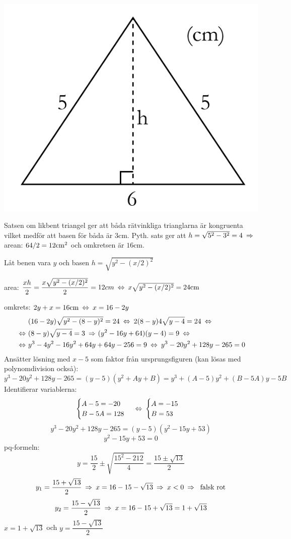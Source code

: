 \begin{task}{3.4}
	\includegraphics[scale=0.3]{images/34.PNG}
	
	Satsen om likbent triangel ger att båda rätvinkliga trianglarna är kongruenta vilket medför att basen för båda är $3\text{cm}$.
	Pyth. sats ger att $h=\sqrt{5^2-3^2}=4 \ra$ arean: $6\*4/2=12\text{cm}^2$ och omkretsen är $16\text{cm}$.
	
	Låt benen vara $y$ och basen $h=\sqrt{y^2-(x/2)^2}$ 
	
	area: $\dfrac{x\*h}{2}=\dfrac{x\sqrt{y^2-(x/2)^2}}{2}=12cm \lra x\sqrt{y^2-(x/2)^2}=24\text{cm}$ 
	
	omkrets: $2y+x=16\text{cm} \lra x=16-2y$
	\begin{align*}
	&(16-2y)\sqrt{y^2-(8-y)^2}=24 \lra
	2(8-y)4\sqrt{y-4}=24 \lra \\ \lra
	&(8-y)\sqrt{y-4}=3 \ra
	(y^2-16y+64)(y-4)=9 \lra \\ \lra
	&y^3-4y^2-16y^2+64y+64y-256=9 \lra
	y^3-20y^2+128y-265=0
	\end{align*}
	Ansätter lösning med $x-5$ som faktor från ursprungsfiguren (kan lösas med polynomdivision också):
	\[y^3-20y^2+128y-265=(y-5)(y^2+Ay+B)=y^3+(A-5)y^2+(B-5A)y-5B\]
	Identifierar variablerna:
	\[\begin{cases}
	A-5=-20 \\
	B-5A=128
	\end{cases}
	\lra
	\begin{cases}
	A=-15 \\
	B=53
	\end{cases}\]
	\[y^3-20y^2+128y-265=(y-5)(y^2-15y+53)\]
	\[y^2-15y+53=0\]
	pq-formeln:
	\[y=\dfrac{15}{2}\pm\sqrt{\dfrac{15^2-212}{4}}=\dfrac{15\pm\sqrt{13}}{2}\]
	\[y_1=\dfrac{15+\sqrt{13}}{2} \ra
	x=16-15-\sqrt{13} \ra
	x < 0 \ra\text{ falsk rot}\]
	\[y_2=\dfrac{15-\sqrt{13}}{2} \ra x=16-15+\sqrt{13}=1+\sqrt{13}\]
	\ans $x=1+\sqrt{13}$ och $y=\dfrac{15-\sqrt{13}}{2}$
\end{task}


